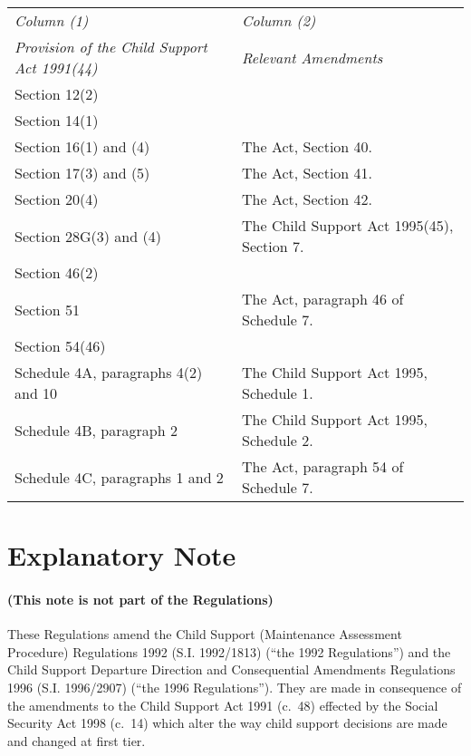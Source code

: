 \documentclass[12pt,a4paper]{article}
\begin{document}
{\footnotesize
\begin{tabulary}{\linewidth}{JJ}
\hline
\itshape Column (1) & \itshape Column (2)\\
\itshape Provision of the Child Support Act 1991(44) & \itshape Relevant Amendments\\
\hline
Section 12(2)\\
Section 14(1)\\
Section 16(1) and (4)&The Act, Section 40.\\
Section 17(3) and (5)&The Act, Section 41.\\
Section 20(4)&The Act, Section 42.\\
Section 28G(3) and (4)&The Child Support Act 1995(45), Section 7.\\
Section 46(2)\\
Section 51&The Act, paragraph 46 of Schedule 7.\\
Section 54(46)\\
Schedule 4A, paragraphs 4(2) and 10&The Child Support Act 1995, Schedule 1.\\
Schedule 4B, paragraph 2&The Child Support Act 1995, Schedule 2.\\
Schedule 4C, paragraphs 1 and 2&The Act, paragraph 54 of Schedule 7.\\
\end{tabulary}

}

\part{Explanatory Note}

\renewcommand\parthead{--- Explanatory Note}

\subsection*{(This note is not part of the Regulations)}

These Regulations amend the Child Support (Maintenance Assessment Procedure) Regulations 1992 (S.I. 1992/1813) (“the 1992 Regulations”) and the Child Support Departure Direction and Consequential Amendments Regulations 1996 (S.I. 1996/2907) (“the 1996 Regulations”). They are made in consequence of the amendments to the Child Support Act 1991 (c.\ 48) effected by the Social Security Act 1998 (c.\ 14) which alter the way child support decisions are made and changed at first tier.
\end{document}
